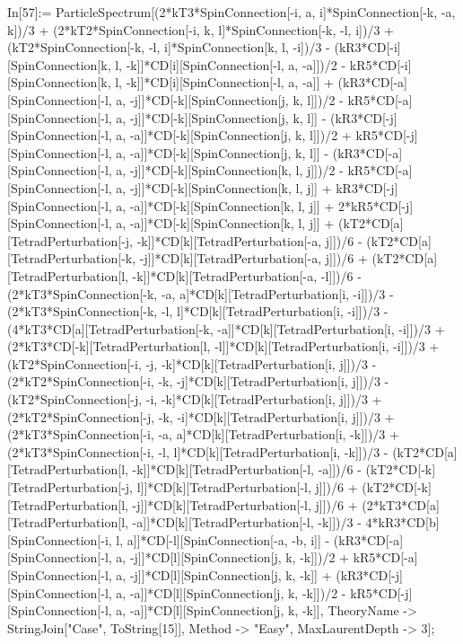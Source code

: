 In[57]:= ParticleSpectrum[(2*kT3*SpinConnection[-i, a, i]*SpinConnection[-k, -a, k])/3 + (2*kT2*SpinConnection[-i, k, l]*SpinConnection[-k, -l, i])/3 + (kT2*SpinConnection[-k, -l, i]*SpinConnection[k, l, -i])/3 - (kR3*CD[-i][SpinConnection[k, l, -k]]*CD[i][SpinConnection[-l, a, -a]])/2 - kR5*CD[-i][SpinConnection[k, l, -k]]*CD[i][SpinConnection[-l, a, -a]] + (kR3*CD[-a][SpinConnection[-l, a, -j]]*CD[-k][SpinConnection[j, k, l]])/2 - kR5*CD[-a][SpinConnection[-l, a, -j]]*CD[-k][SpinConnection[j, k, l]] - (kR3*CD[-j][SpinConnection[-l, a, -a]]*CD[-k][SpinConnection[j, k, l]])/2 + kR5*CD[-j][SpinConnection[-l, a, -a]]*CD[-k][SpinConnection[j, k, l]] - (kR3*CD[-a][SpinConnection[-l, a, -j]]*CD[-k][SpinConnection[k, l, j]])/2 - kR5*CD[-a][SpinConnection[-l, a, -j]]*CD[-k][SpinConnection[k, l, j]] + kR3*CD[-j][SpinConnection[-l, a, -a]]*CD[-k][SpinConnection[k, l, j]] + 2*kR5*CD[-j][SpinConnection[-l, a, -a]]*CD[-k][SpinConnection[k, l, j]] + (kT2*CD[a][TetradPerturbation[-j, -k]]*CD[k][TetradPerturbation[-a, j]])/6 - (kT2*CD[a][TetradPerturbation[-k, -j]]*CD[k][TetradPerturbation[-a, j]])/6 + (kT2*CD[a][TetradPerturbation[l, -k]]*CD[k][TetradPerturbation[-a, -l]])/6 - (2*kT3*SpinConnection[-k, -a, a]*CD[k][TetradPerturbation[i, -i]])/3 - (2*kT3*SpinConnection[-k, -l, l]*CD[k][TetradPerturbation[i, -i]])/3 - (4*kT3*CD[a][TetradPerturbation[-k, -a]]*CD[k][TetradPerturbation[i, -i]])/3 + (2*kT3*CD[-k][TetradPerturbation[l, -l]]*CD[k][TetradPerturbation[i, -i]])/3 + (kT2*SpinConnection[-i, -j, -k]*CD[k][TetradPerturbation[i, j]])/3 - (2*kT2*SpinConnection[-i, -k, -j]*CD[k][TetradPerturbation[i, j]])/3 - (kT2*SpinConnection[-j, -i, -k]*CD[k][TetradPerturbation[i, j]])/3 + (2*kT2*SpinConnection[-j, -k, -i]*CD[k][TetradPerturbation[i, j]])/3 + (2*kT3*SpinConnection[-i, -a, a]*CD[k][TetradPerturbation[i, -k]])/3 + (2*kT3*SpinConnection[-i, -l, l]*CD[k][TetradPerturbation[i, -k]])/3 - (kT2*CD[a][TetradPerturbation[l, -k]]*CD[k][TetradPerturbation[-l, -a]])/6 - (kT2*CD[-k][TetradPerturbation[-j, l]]*CD[k][TetradPerturbation[-l, j]])/6 + (kT2*CD[-k][TetradPerturbation[l, -j]]*CD[k][TetradPerturbation[-l, j]])/6 + (2*kT3*CD[a][TetradPerturbation[l, -a]]*CD[k][TetradPerturbation[-l, -k]])/3 - 4*kR3*CD[b][SpinConnection[-i, l, a]]*CD[-l][SpinConnection[-a, -b, i]] - (kR3*CD[-a][SpinConnection[-l, a, -j]]*CD[l][SpinConnection[j, k, -k]])/2 + kR5*CD[-a][SpinConnection[-l, a, -j]]*CD[l][SpinConnection[j, k, -k]] + (kR3*CD[-j][SpinConnection[-l, a, -a]]*CD[l][SpinConnection[j, k, -k]])/2 - kR5*CD[-j][SpinConnection[-l, a, -a]]*CD[l][SpinConnection[j, k, -k]], TheoryName -> StringJoin["Case", ToString[15]], Method -> "Easy", MaxLaurentDepth -> 3]; 